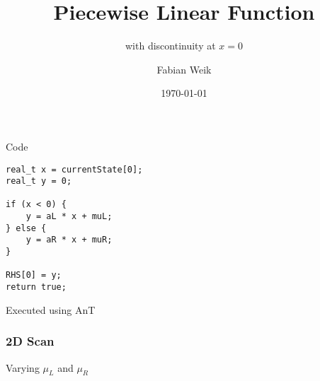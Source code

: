 \documentclass{beamer}
\title{Piecewise Linear Function}
\subtitle{with discontinuity at $x = 0$}
\author{Fabian Weik}
\institute{Overleaf}
\date{\today}
\begin{document}
\frame{\titlepage}

\begin{frame}[fragile]{Code}
    \begin{lstlisting}
real_t x = currentState[0];
real_t y = 0;

if (x < 0) {
    y = aL * x + muL;
} else {
    y = aR * x + muR;
}

RHS[0] = y;
return true;
    \end{lstlisting}
    
    Executed using AnT
    
\end{frame}

\begin{frame}
\frametitle{2D Scan}
    Varying $\mu_L$ and $\mu_R$
\end{frame}
\end{document}
